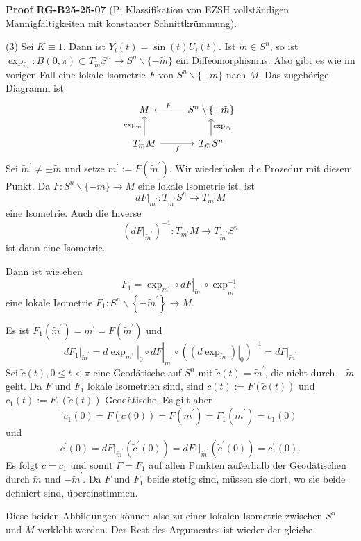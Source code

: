 \documentclass[10pt, letterpaper]{article}
\newcommand{\CustomHeading}[3]{%
  \par\medskip\noindent%
  \textbf{#1 #2} \textnormal{(#3)}.\enskip%
}
\newenvironment{PROOF}[2]{\begin{unitbox}\CustomHeading{Proof}{#1}{#2}}{\end{unitbox}}
\begin{document}
\begin{PROOF}{RG-B25-25-07}{P: Klassifikation von EZSH vollständigen Mannigfaltigkeiten mit konstanter Schnittkrümmung}
(3) Sei $K \equiv 1$. Dann ist $Y_{i}(t)=\sin (t) U_{i}(t)$. Ist $\tilde{m} \in S^{n}$, so ist $\exp _{\tilde{m}}: B(0, \pi) \subset T_{\tilde{m}} S^{n} \rightarrow S^{n} \backslash\{-\tilde{m}\}$ ein Diffeomorphismus. Also gibt es wie im vorigen Fall eine lokale Isometrie $F$ von $S^{n} \backslash\{-\tilde{m}\}$ nach $M$. Das zugehörige Diagramm ist
\[
\begin{tikzcd}
M & S^n \setminus \{-\tilde{m}\} \arrow[l, "F"'] \\
T_m M \arrow[u, "\exp_m"] \arrow[r, "f"'] 
& T_{\tilde{m}} S^n \arrow[u, "\exp_{\tilde{m}}"']
\end{tikzcd}
\]
Sei $\tilde{m}^{\prime} \neq \pm \tilde{m}$ und setze $m^{\prime}:=F\left(\tilde{m}^{\prime}\right)$. Wir wiederholen die Prozedur mit diesem Punkt. Da $F: S^{n} \backslash\{-\tilde{m}\} \rightarrow M$ eine lokale Isometrie ist, ist
$$
\left.d F\right|_{\tilde{m}^{\prime}}: T_{\tilde{m}^{\prime}} S^{n} \rightarrow T_{m^{\prime}} M
$$
eine Isometrie. Auch die Inverse
$$
\left(\left.d F\right|_{\tilde{m}^{\prime}}\right)^{-1}: T_{m^{\prime}} M \rightarrow T_{\tilde{m}^{\prime}} S^{n}
$$
ist dann eine Isometrie.

Dann ist wie eben
$$
F_{1}=\left.\exp _{m^{\prime}} \circ d F\right|_{\tilde{m}^{\prime}} \circ \exp _{\tilde{m}^{\prime}}^{-1}
$$
eine lokale Isometrie $F_{1}: S^{n} \backslash\left\{-\tilde{m}^{\prime}\right\} \rightarrow M$.

Es ist $F_{1}\left(\tilde{m}^{\prime}\right)=m^{\prime}=F\left(\tilde{m}^{\prime}\right)$ und 
$$\left.d F_{1}\right|_{\tilde{m}^{\prime}}=\left.\left.d \exp _{m^{\prime}}\right|_{0} \circ d F\right|_{\tilde{m}^{\prime}} \circ\left(\left.\left(d \exp _{\tilde{m}}\right)\right|_{0}\right)^{-1}=\left.d F\right|_{\tilde{m}^{\prime}}$$
Sei $\tilde{c}(t), 0 \leq t<\pi$ eine Geodätische auf $S^{n}$ mit $\tilde{c}(t)=\tilde{m}^{\prime}$, die nicht durch $-\tilde{m}$ geht. Da $F$ und $F_{1}$ lokale Isometrien sind, sind $c(t):=F(\tilde{c}(t))$ und $c_{1}(t):=F_{1}(\tilde{c}(t))$ Geodätische. Es gilt aber
$$c_{1}(0)=F(\tilde{c}(0))=F\left(\tilde{m}^{\prime}\right)=F_{1}\left(\tilde{m}^{\prime}\right)=c_{1}(0)$$ 
und
$$
c^{\prime}(0)=\left.d F\right|_{\tilde{m}^{\prime}}\left(\tilde{c}^{\prime}(0)\right)=\left.d F_{1}\right|_{\tilde{m}^{\prime}}\left(\tilde{c}^{\prime}(0)\right)=c_{1}^{\prime}(0) .
$$
Es folgt $c=c_{1}$ und somit $F=F_{1}$ auf allen Punkten außerhalb der Geodätischen durch $\tilde{m}$ und $-\tilde{m}^{\prime}$. Da $F$ und $F_{1}$ beide stetig sind, müssen sie dort, wo sie beide definiert sind, übereinstimmen.

Diese beiden Abbildungen können also zu einer lokalen Isometrie zwischen $S^{n}$ und $M$ verklebt werden. Der Rest des Argumentes ist wieder der gleiche.
\end{PROOF}
\end{document}
